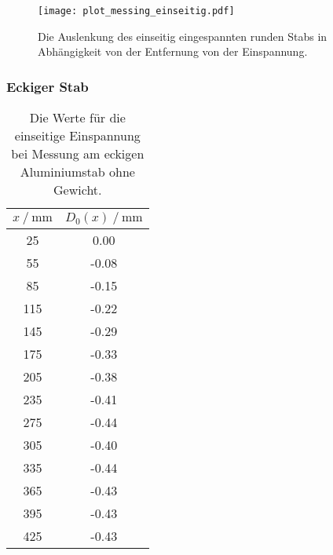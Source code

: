 \begin{figure}
  \centering
  \texttt{[image: plot\_messing\_einseitig.pdf]}
  \caption{Die Auslenkung des einseitig eingespannten runden Stabs in Abhängigkeit 
  von der Entfernung von der Einspannung.}
  \label{fig:plot_messing_einseitig}
\end{figure}

\subsubsection{Eckiger Stab}
\label{sec:Eckiger Stab}

\begin{table}[H]
  \centering
  \caption{Die Werte für die einseitige Einspannung bei Messung am eckigen Aluminiumstab ohne Gewicht.}
  \begin{tabular}{cc}
    \toprule
    {$x \mathbin{/} \unit{\milli\metre}$} &
    {$D_0(x) \mathbin{/} \unit{\milli\metre}$} \\
    \midrule
     25 &  0.00 \\
     55 & -0.08 \\
     85 & -0.15 \\
    115 & -0.22 \\
    145 & -0.29 \\
    175 & -0.33 \\   
    205 & -0.38 \\
    235 & -0.41 \\
    275 & -0.44 \\
    305 & -0.40 \\
    335 & -0.44 \\
    365 & -0.43 \\
    395 & -0.43 \\
    425 & -0.43 \\
    
    \bottomrule
  \end{tabular}
  \label{tab:Tabelle3}
\end{table}

